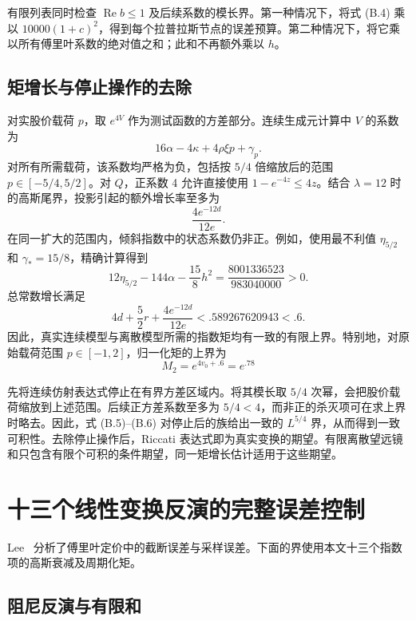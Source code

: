 有限列表同时检查 \(\operatorname{Re}b\le1\) 及后续系数的模长界。第一种情况下，将式 (B.4) 乘以 \(10000(1+c)^2\)，得到每个拉普拉斯节点的误差预算。第二种情况下，将它乘以所有傅里叶系数的绝对值之和；此和不再额外乘以 \(h\)。

\subsection{矩增长与停止操作的去除}

对实股价载荷 \(p\)，取 \(e^{4V}\) 作为测试函数的方差部分。连续生成元计算中 \(V\) 的系数为
\[
16\alpha-4\kappa+4\rho\xi p+\gamma_p.
\tag{B.5}
\]
对所有所需载荷，该系数均严格为负，包括按 \(5/4\) 倍缩放后的范围 \(p\in[-5/4,5/2]\)。对 \(Q\)，正系数 4 允许直接使用 \(1-e^{-4z}\le4z\)。结合 \(\lambda=12\) 时的高斯尾界，投影引起的额外增长率至多为
\[
\frac{4e^{-12d}}{12e}.
\]
在同一扩大的范围内，倾斜指数中的状态系数仍非正。例如，使用最不利值 \(\eta_{5/2}\) 和 \(\gamma_*=15/8\)，精确计算得到
\[
12\eta_{5/2}-144\alpha-\frac{15}{8}h^2
=\frac{8001336523}{983040000}>0.
\]
总常数增长满足
\[
4d+\frac52r+\frac{4e^{-12d}}{12e}
<.589267620943<.6.
\tag{B.6}
\]
因此，真实连续模型与离散模型所需的指数矩均有一致的有限上界。特别地，对原始载荷范围 \(p\in[-1,2]\)，归一化矩的上界为
\[
M_2=e^{4v_0+.6}=e^{.78}
\tag{B.7}
\]

先将连续仿射表达式停止在有界方差区域内。将其模长取 \(5/4\) 次幂，会把股价载荷缩放到上述范围。后续正方差系数至多为 \(5/4<4\)，而非正的杀灭项可在求上界时略去。因此，式 (B.5)--(B.6) 对停止后的族给出一致的 \(L^{5/4}\) 界，从而得到一致可积性。去除停止操作后，Riccati 表达式即为真实变换的期望。有限离散望远镜和只包含有限个可积的条件期望，同一矩增长估计适用于这些期望。

\section{十三个线性变换反演的完整误差控制}

Lee~\cite{Lee2004} 分析了傅里叶定价中的截断误差与采样误差。下面的界使用本文十三个指数项的高斯衰减及周期化矩。

\subsection{阻尼反演与有限和}


